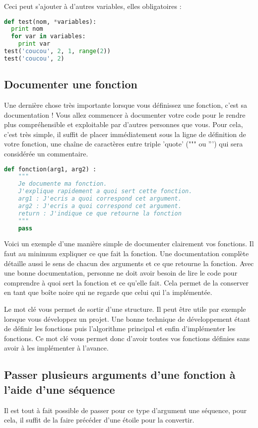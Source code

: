 \documentclass[a4paper,twoside]{article}
\begin{document}
Ceci peut s'ajouter à d'autres variables, elles obligatoires :
\begin{lstlisting}[language=python]
def test(nom, *variables):
  print nom
  for var in variables:
    print var
test('coucou', 2, 1, range(2))
test('coucou', 2)
\end{lstlisting}

\subsection{Documenter une fonction}

Une dernière chose très importante lorsque vous définissez une fonction, c'est sa documentation ! Vous allez commencer à documenter votre code pour le rendre plus compréhensible et exploitable par d'autres personnes que vous. Pour cela, c'est très simple, il suffit de placer immédiatement sous la ligne de définition de votre fonction, une chaîne de caractères entre triple 'quote' (""" ou ''') qui sera considérée un commentaire.

\begin{lstlisting}[language=python]
def fonction(arg1, arg2) :
    """
    Je documente ma fonction. 
    J'explique rapidement a quoi sert cette fonction.
    arg1 : J'ecris a quoi correspond cet argument.
    arg2 : J'ecris a quoi correspond cet argument.
    return : J'indique ce que retourne la fonction
    """
    pass
\end{lstlisting}

Voici un exemple d'une manière simple de documenter clairement vos fonctions. Il faut au minimum expliquer ce que fait la fonction. Une documentation complète détaille aussi le sens de chacun des arguments et ce que retourne la fonction. Avec une bonne documentation, personne ne doit avoir besoin de lire le code pour comprendre à quoi sert la fonction et ce qu'elle fait. Cela permet de la conserver en tant que boîte noire qui ne regarde que celui qui l'a implémentée.

\begin{remarque}
Le mot clé  vous permet de sortir d'une structure. Il peut être utile par exemple lorsque vous développez un projet. Une bonne technique de développement étant de définir les fonctions puis l'algorithme principal et enfin d'implémenter les fonctions. Ce mot clé vous permet donc d'avoir toutes vos fonctions définies sans avoir à les implémenter à l'avance.
\end{remarque}

\subsection{Passer plusieurs arguments d'une fonction à l'aide d'une séquence}\label{sec:args_liste}
Il est tout à fait possible de passer pour ce type d'argument une séquence, pour cela, il suffit de la faire précéder d'une étoile pour la convertir.
\end{document}
